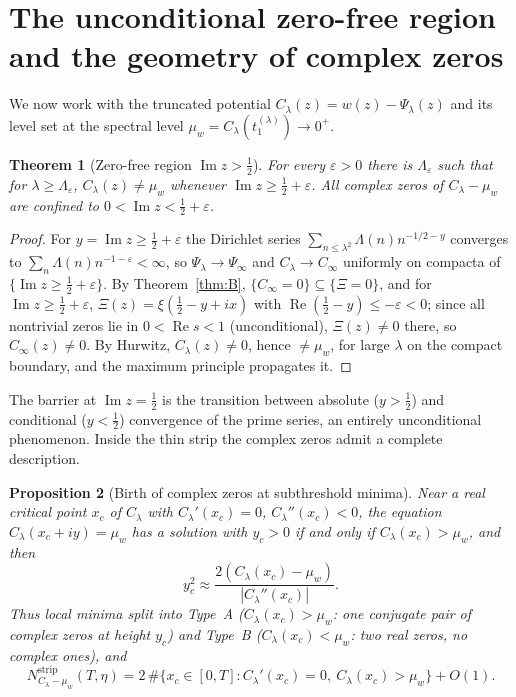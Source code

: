 \documentclass[11pt]{amsart}
\newtheorem{theorem}{Theorem}[section]
\newtheorem{proposition}[theorem]{Proposition}
\theoremstyle{definition}
\theoremstyle{remark}
\renewcommand{\Re}{\operatorname{Re}}
\renewcommand{\Im}{\operatorname{Im}}
\newcommand{\half}{\tfrac12}
\newcommand{\Cinf}{C_\infty}
\newcommand{\Clam}{C_\lambda}
\newcommand{\muw}{\mu_w}
\begin{document}
\section{The unconditional zero-free region and the geometry of complex zeros}\label{sec:geom}

We now work with the truncated potential $\Clam(z)=w(z)-\Psi_\lambda(z)$ and its level set at
the spectral level $\muw=\Clam(t_1^{(\lambda)})\to0^+$.

\begin{theorem}[Zero-free region $\Im z>\half$]\label{thm:zero-free}
For every $\varepsilon>0$ there is $\Lambda_\varepsilon$ such that for $\lambda\ge
\Lambda_\varepsilon$, $\Clam(z)\ne\muw$ whenever $\Im z\ge\half+\varepsilon$. All complex
zeros of $\Clam-\muw$ are confined to $0<\Im z<\half+\varepsilon$.
\end{theorem}
\begin{proof}
For $y=\Im z\ge\half+\varepsilon$ the Dirichlet series $\sum_{n\le\lambda^2}\Lambda(n)
n^{-1/2-y}$ converges to $\sum_n\Lambda(n)n^{-1-\varepsilon}<\infty$, so $\Psi_\lambda\to
\Psi_\infty$ and $\Clam\to\Cinf$ uniformly on compacta of $\{\Im z\ge\half+\varepsilon\}$. By
Theorem~\ref{thm:B}, $\{\Cinf=0\}\subseteq\{\Xi=0\}$, and for $\Im z\ge\half+\varepsilon$,
$\Xi(z)=\xi(\half-y+ix)$ with $\Re(\half-y)\le-\varepsilon<0$; since all nontrivial zeros lie
in $0<\Re s<1$ (unconditional), $\Xi(z)\ne0$ there, so $\Cinf(z)\ne0$. By Hurwitz, $\Clam
(z)\ne0$, hence $\ne\muw$, for large $\lambda$ on the compact boundary, and the maximum
principle propagates it.
\end{proof}

The barrier at $\Im z=\half$ is the transition between absolute ($y>\half$) and conditional
($y<\half$) convergence of the prime series, an entirely unconditional phenomenon. Inside the
thin strip the complex zeros admit a complete description.

\begin{proposition}[Birth of complex zeros at subthreshold minima]\label{prop:geom}
Near a real critical point $x_c$ of $\Clam$ with $\Clam'(x_c)=0$, $\Clam''(x_c)<0$, the
equation $\Clam(x_c+iy)=\muw$ has a solution with $y_c>0$ if and only if $\Clam(x_c)>\muw$, and
then
\[
y_c^2\approx\frac{2(\Clam(x_c)-\muw)}{|\Clam''(x_c)|}.
\]
Thus local minima split into \emph{Type~A} ($\Clam(x_c)>\muw$: one conjugate pair of complex
zeros at height $y_c$) and \emph{Type~B} ($\Clam(x_c)<\muw$: two real zeros, no complex ones),
and
\[
N^{\mathrm{strip}}_{\Clam-\muw}(T,\eta)=2\,\#\{x_c\in[0,T]:\Clam'(x_c)=0,\ \Clam(x_c)>\muw\}+
O(1).
\]
\end{proposition}
\end{document}
